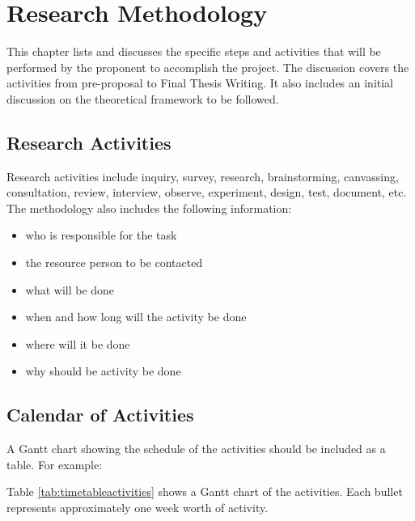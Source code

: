%
%
%                 

\chapter{Research Methodology}
This chapter lists and discusses the specific steps and activities that will be performed by the proponent to accomplish the project. 
The discussion covers the activities from pre-proposal to Final Thesis Writing.  It also includes an initial discussion on the theoretical
framework to be followed.

\section{Research Activities}
Research activities include inquiry, survey, research, brainstorming, canvassing, consultation, review, interview, observe, experiment, design, 
test, document, etc.  The methodology also includes the following information:

\begin{itemize}
   \item who is responsible for the task
   \item the resource person to be contacted
   \item what will be done
   \item when and how long will the activity be done
   \item where will it be done
   \item why should be activity be done
\end{itemize}


\section{Calendar of Activities}

A Gantt chart showing the schedule of the activities should be included as a table. For example:

Table \ref{tab:timetableactivities} shows a Gantt chart of the activities.  Each bullet represents approximately
one week worth of activity.

%
%
\newcommand{\weekone}{\textbullet}
\newcommand{\weektwo}{\textbullet \textbullet}
\newcommand{\weekthree}{\textbullet \textbullet \textbullet}
\newcommand{\weekfour}{\textbullet \textbullet \textbullet \textbullet}

